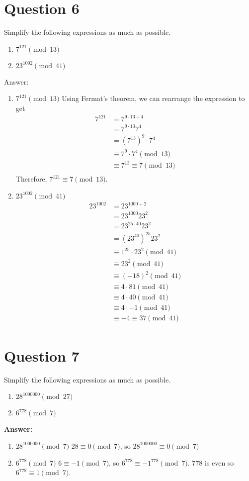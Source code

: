 \documentclass[openany]{report}
\begin{document}
\section{Question 6}
Simplify the following expressions as much as possible. 
\begin{enumerate}[label=(\alph*)]
    \item $7^{121} \pmod{13}$
    \item $23^{1002} \pmod{41}$
\end{enumerate}
\textrm{Answer:}
\begin{enumerate}[label=(\alph*)]
    \item $7^{121} \pmod{13}$
    Using Fermat's theorem, we can rearrange the expression to get 
    \begin{align*}
        7^{121} &= 7^{9 \cdot 13 + 4} \\
        &= 7^{9\cdot 13}7^4\\
        &= (7^{13})^9 \cdot 7^4\\
        &\equiv 7^9 \cdot 7^4 \pmod{13}\\
        &\equiv 7^{13} \equiv 7 \pmod{13}\\ 
    \end{align*}
    Therefore, $7^{121} \equiv 7 \pmod{13}$.
    \item $23^{1002} \pmod{41}$
    \begin{align*}
        23^{1002} &= 23^{1000 + 2}\\
        &= 23^{1000}23^2\\
        &= 23^{25 \cdot 40}23^2\\
        &= (23^{40})^{25}23^2\\
        &\equiv 1^25 \cdot 23^2 \pmod{41}\\
        &\equiv 23^2 \pmod{41}\\
        &\equiv (-18)^2 \pmod{41}\\
        &\equiv 4 \cdot 81 \pmod{41}\\
        &\equiv 4 \cdot 40 \pmod{41}\\
        &\equiv 4 \cdot -1 \pmod{41}\\
        &\equiv -4 \equiv 37 \pmod{41}\\
    \end{align*}
\end{enumerate}
\section{Question 7}
Simplify the following expressions as much as possible. 
\begin{enumerate}[label=(\alph*)]
    \item $28^{1000000} \pmod{27}$
    \item $6^{778} \pmod{7}$
\end{enumerate}
\textbf{Answer:}
\begin{enumerate}[label=(\alph*)]
    \item $28^{1000000} \pmod{7}$
    $28 \equiv 0 \pmod{7}$, so $28^{1000000} \equiv 0 \pmod{7}$
    \item $6^{778} \pmod{7}$
    $6 \equiv -1 \pmod{7}$, so $6^{778} \equiv -1^{778} \pmod{7}$. 778 is even so $6^{778} \equiv 1 \pmod{7}$.
\end{enumerate}
\end{document}
